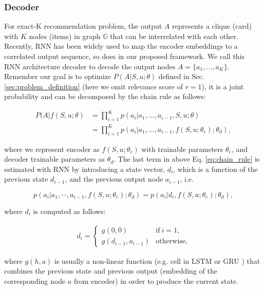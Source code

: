 \subsubsection{Decoder}
\label{sec:decoder}
For exact-K recommendation problem, the output $A$ represents a clique (card) with $K$ nodes (items) in graph $\mathbb{G}$ that can be interrelated with each other.
Recently, RNN \cite{vinyals2015pointer} has been widely used to map the encoder embeddings to a correlated output sequence,
so does in our proposed framework. 
We call this RNN architecture decoder to decode the output nodes $A=\{a_1,\dots,a_K\}$.
Remember our goal is to optimize $P(A|S,u;\theta)$ defined in Sec. \ref{sec:problem_definition} (here we omit relevance score of $r=1$),
it is a joint probability and can be decomposed by the chain rule as follows:
\begin{small}
\begin{equation}
\label{eq:chain_rule}
\begin{aligned}
P(A|f(S,u;\theta)&=\prod_{i=1}^{K}p(a_i|a_1,\dots,a_{i-1},S,u;\theta)\\
&=\prod_{i=1}^{K}p(a_i|a_1,\dots,a_{i-1},f(S,u;\theta_e);\theta_d),
\end{aligned}
\end{equation}
\end{small}
where we represent encoder as $f(S,u;\theta_e)$ with trainable parameters $\theta_e$, and decoder trainable parameters as $\theta_d$.
The last term in above
Eq. \ref{eq:chain_rule} is estimated with RNN by introducing a state vector,
$d_i$, which is a function of the previous state $d_{i-1}$, and the previous output node $a_{i-1}$, i.e.
\begin{small}
\begin{equation}
p(a_i|a_1,\cdots,a_{i-1},f(S,u;\theta_e);\theta_d)=p(a_i|d_{i},f(S,u;\theta_e);\theta_d),
\end{equation}
\end{small}
where $d_i$ is computed as follows:
\begin{small}
\begin{eqnarray}
\label{eq:rnn_hidden}
d_i = 
\begin{cases}
g(0,0) & \text{if}\ i=1, \\
g(d_{i-1},a_{i-1}) & \text{otherwise},
\end{cases}
\end{eqnarray}
\end{small}
where $g(h,a)$ is usually a non-linear function (e.g. cell in LSTM \cite{hochreiter1997long} or GRU \cite{chung2014empirical}) that combines the previous state and previous output
(embedding of the corresponding node $a$ from encoder) in order to produce the current state.

